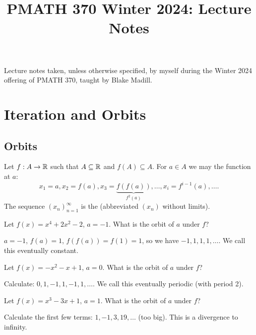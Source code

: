 \documentclass[class=pmath370,tikz,notes]{agony}
\title{PMATH 370 Winter 2024: Lecture Notes}
\begin{document}
\renewcommand{\contentsname}{PMATH 370 Winter 2024:\\{\huge Lecture Notes}}
\thispagestyle{firstpage}
\tableofcontents

Lecture notes taken, unless otherwise specified,
by myself during the Winter 2024 offering of PMATH 370,
taught by Blake Madill.

\begin{multicols}{2}
  \listoflecture
\end{multicols}

\chapter{Iteration and Orbits}

\section{Orbits}

\begin{defn}[iteration]
  Let $f : A \to \mathbb{R}$ such that $A \subseteq \mathbb{R}$ and $f(A) \subseteq A$.
  For $a \in A$ we may  the function at $a$:
  \[ x_1 = a, x_2 = f(a), x_3 = \underbrace{f(f(a))}_{f^2(a)}, \dotsc, x_i = f^{i-1}(a), \dotsc. \]
  The sequence $(x_n)_{n=1}^\infty$ is the 
  (abbreviated $(x_n)$ without limits).
\end{defn}

\begin{example}
  Let $f(x) = x^4 + 2x^2 - 2$, $a = -1$. What is the orbit of $a$ under $f$?
\end{example}
\begin{sol}
  $a = -1$, $f(a) = 1$, $f(f(a)) = f(1) = 1$, so we have $-1,1,1,1,\dotsc$.
  We call this eventually constant.
\end{sol}

\begin{example}
  Let $f(x) = -x^2 - x + 1$, $a = 0$. What is the orbit of $a$ under $f$?
\end{example}
\begin{sol}
  Calculate: $0, 1, -1, 1, -1, 1, \dotsc$.
  We call this eventually periodic (with period 2).
\end{sol}

\begin{example}
  Let $f(x) = x^3 - 3x + 1$, $a = 1$. What is the orbit of $a$ under $f$?
\end{example}
\begin{sol}
  Calculate the first few terms: $1, -1, 3, 19, \dotsc$ (too big).
  This is a divergence to infinity.
\end{sol}
\end{document}
